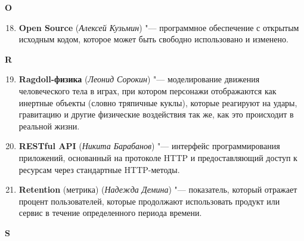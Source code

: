 \begin{flushleft} \large\textbf{O} \end{flushleft}

\begin{enumerate}
    \setcounter{enumi}{17}

    \item \textbf{Open Source} (\textit{Алексей Кузьмин}) "--- 
    программное обеспечение с открытым исходным кодом, которое может быть свободно использовано и изменено. 
\end{enumerate}

\begin{flushleft} \large\textbf{R} \end{flushleft}

\begin{enumerate}
    \setcounter{enumi}{18}

    \item \textbf{Ragdoll-физика} (\textit{Леонид Сорокин}) "--- 
    моделирование движения человеческого тела в играх, при котором персонажи отображаются как инертные объекты (словно тряпичные куклы), которые реагируют на удары, гравитацию и другие физические воздействия так же, как это происходит в реальной жизни.  

    \item \textbf{RESTful API} (\textit{Никита Барабанов}) "--- 
    интерфейс программирования приложений, основанный на протоколе HTTP и предоставляющий доступ к ресурсам через стандартные HTTP-методы. 

    \item \textbf{Retention} (метрика) (\textit{Надежда Демина}) "--- 
    показатель, который отражает процент пользователей, которые продолжают использовать продукт или сервис в течение определенного периода времени.
\end{enumerate}

\begin{flushleft} \large\textbf{S} \end{flushleft}

